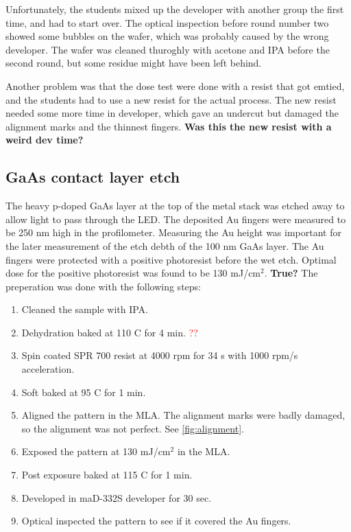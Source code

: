 Unfortunately, the students mixed up the developer with another group the first time, and had to start over.
The optical inspection before round number two showed some bubbles on the wafer, which was probably caused by the wrong developer.
The wafer was cleaned thuroghly with acetone and IPA before the second round, but some residue might have been left behind.

Another problem was that the dose test were done with a resist that got emtied, and the students had to use a new resist for the actual process.
The new resist needed some more time in developer, which gave an undercut but damaged the alignment marks and the thinnest fingers.
\textbf{Was this the new resist with a weird dev time?}




\subsection{GaAs contact layer etch}
\label{methods:wet_etch}
The heavy p-doped GaAs layer at the top of the metal stack was etched away to allow light to pass through the LED.
The deposited Au fingers were measured to be 250 nm high in the profilometer.
Measuring the Au height was important for the later measurement of the etch debth of the 100 nm GaAs layer.
The Au fingers were protected with a positive photoresist before the wet etch.
Optimal dose for the positive photoresist was found to be 130 mJ/cm$^2$. \textbf{True?}
The preperation was done with the following steps:
\begin{enumerate}
    \item Cleaned the sample with IPA.
    \item Dehydration baked at 110 \textdegree C for 4 min. \textcolor{red}{??}
    \item Spin coated SPR 700 resist at 4000 rpm for 34 s with 1000 rpm/s acceleration.
    \item Soft baked at 95 \textdegree C for 1 min.
    \item Aligned the pattern in the MLA. The alignment marks were badly damaged, so the alignment was not perfect. See \autoref{fig:alignment}.
    \item Exposed the pattern at 130 mJ/cm$^2$ in the MLA.
    \item Post exposure baked at 115 \textdegree C for 1 min.
    \item Developed in maD-332S developer for 30 sec.
    \item Optical inspected the pattern to see if it covered the Au fingers.
\end{enumerate}

